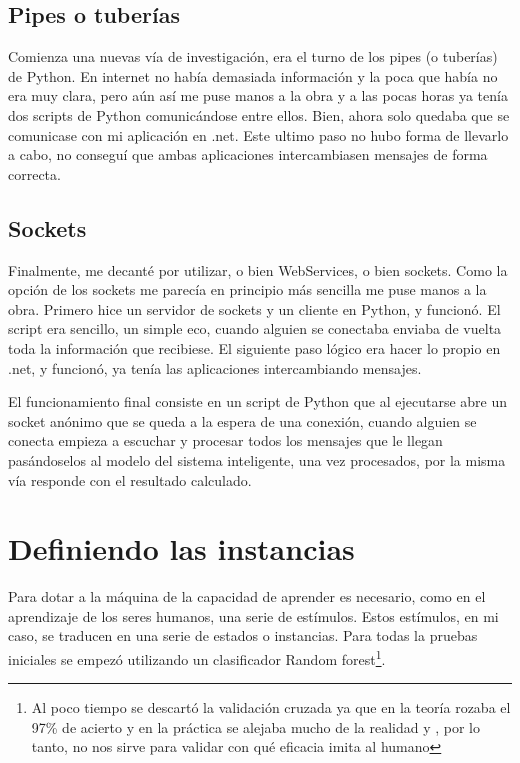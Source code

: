 \subsection{Pipes o tuberías}
Comienza una nuevas vía de investigación, era el turno de los pipes (o tuberías) de Python. En internet no había demasiada información y la poca que había no era muy clara, pero aún así me puse manos a la obra y a las pocas horas ya tenía dos scripts de Python comunicándose entre ellos. Bien, ahora solo quedaba que se comunicase con mi aplicación en .net. Este ultimo paso no hubo forma de llevarlo a cabo, no conseguí que ambas aplicaciones intercambiasen mensajes de forma correcta.

\subsection{Sockets}
Finalmente, me decanté por utilizar, o bien WebServices, o bien sockets. Como la opción de los sockets me parecía en principio más sencilla me puse manos a la obra. Primero hice un servidor de sockets y un cliente en Python, y funcionó. El script era sencillo, un simple eco, cuando alguien se conectaba enviaba de vuelta toda la información que recibiese. El siguiente paso lógico era hacer lo propio en .net, y funcionó, ya tenía las aplicaciones intercambiando mensajes.

El funcionamiento final consiste en un script de Python que al ejecutarse abre un socket anónimo que se queda a la espera de una conexión, cuando alguien se conecta empieza a escuchar y procesar todos los mensajes que le llegan pasándoselos al modelo del sistema inteligente, una vez procesados, por la misma vía responde con el resultado calculado.


\section{Definiendo las instancias}

Para dotar a la máquina de la capacidad de aprender es necesario, como en el aprendizaje de los seres humanos, una serie de estímulos. Estos estímulos, en mi caso, se traducen en una serie de estados o instancias. Para todas la pruebas iniciales se empezó utilizando un clasificador Random forest\footnote{Al poco tiempo se descartó la validación cruzada ya que en la teoría rozaba el 97\% de acierto y en la práctica se alejaba mucho de la realidad y , por lo tanto, no nos sirve para validar con qué eficacia imita al humano}.

